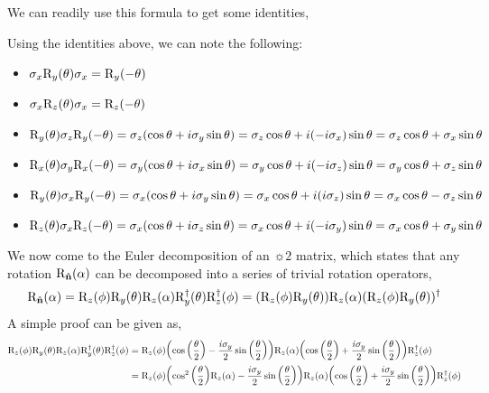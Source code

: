 We can readily use this formula to get some identities, 
\begin{identity}
   Using the identities above, we can note the following:
    \begin{itemize}
        \item $\sigma_x \mathrm{R}_{y}\qty(\theta) \sigma_x = \mathrm{R}_{y}\qty(-\theta)$
     \item $\sigma_x \mathrm{R}_{z}\qty(\theta) \sigma_x = \mathrm{R}_{z}\qty(-\theta)$  
       \item $\mathrm{R}_{y}\qty(\theta)\sigma_z \mathrm{R}_{y}\qty(-\theta)  = \sigma_z \qty(\cos \theta + i\sigma_y \sin\theta) = \sigma_z \cos\theta + i (-i\sigma_x)\sin\theta = \sigma_z \cos\theta + \sigma_x \sin\theta$
        \item $\mathrm{R}_{x}\qty(\theta)\sigma_y \mathrm{R}_{x}\qty(-\theta)  = \sigma_y \qty(\cos \theta + i\sigma_x \sin\theta) = \sigma_y \cos\theta + i (-i\sigma_z)\sin\theta = \sigma_y \cos\theta + \sigma_z \sin\theta$
        \item $\mathrm{R}_{y}\qty(\theta)\sigma_x \mathrm{R}_{y}\qty(-\theta)  = \sigma_x \qty(\cos \theta + i\sigma_y \sin\theta) = \sigma_x \cos\theta + i (i\sigma_z)\sin\theta = \sigma_x \cos\theta - \sigma_z \sin\theta$
        \item $\mathrm{R}_{z}\qty(\theta)\sigma_x \mathrm{R}_{z}\qty(-\theta)  = \sigma_x \qty(\cos \theta + i\sigma_z \sin\theta) = \sigma_x \cos\theta + i (-i\sigma_y)\sin\theta = \sigma_x \cos\theta + \sigma_y \sin\theta$
    \end{itemize}
\end{identity}
We now come to the Euler decomposition of an $\sun{2}$ matrix, which states that any rotation $\mathrm{R}_{\vb{\hat{n}}}\qty(\alpha)$ can be decomposed into a series of trivial rotation operators,
$$\mathrm{R}_{\vb{\hat{n}}}\qty(\alpha) = \mathrm{R}_{z}\qty(\phi) \mathrm{R}_{y}\qty(\theta) \mathrm{R}_{z}\qty(\alpha)\mathrm{R}_{y}^\dagger(\theta)\mathrm{R}_{z}^\dagger(\phi)=  (\mathrm{R}_{z}\qty(\phi) \mathrm{R}_{y}\qty(\theta)) \mathrm{R}_{z}\qty(\alpha)(\mathrm{R}_{z}\qty(\phi) \mathrm{R}_{y}\qty(\theta))^\dagger$$ 
A simple proof can be given as,
\begin{align*}
    \mathrm{R}_{z}\qty(\phi) \mathrm{R}_{y}\qty(\theta) \mathrm{R}_{z}\qty(\alpha)\mathrm{R}_{y}^\dagger(\theta)\mathrm{R}_{z}^\dagger(\phi) &=\mathrm{R}_{z}\qty(\phi) \qty(\cos\qty(\frac{\theta}{2}) - \frac{i\sigma_y}{2}\sin\qty(\frac{\theta}{2})) \mathrm{R}_{z}\qty(\alpha)\qty(\cos\qty(\frac{\theta}{2}) + \frac{i\sigma_y}{2}\sin\qty(\frac{\theta}{2}))\mathrm{R}_{z}^\dagger(\phi)\\
    &=\mathrm{R}_{z}\qty(\phi) \qty(\cos^2\qty(\frac{\theta}{2})\mathrm{R}_{z}\qty(\alpha) - \frac{i\sigma_y}{2}\sin\qty(\frac{\theta}{2})) \mathrm{R}_{z}\qty(\alpha)\qty(\cos\qty(\frac{\theta}{2}) + \frac{i\sigma_y}{2}\sin\qty(\frac{\theta}{2}))\mathrm{R}_{z}^\dagger(\phi)\\
\end{align*}